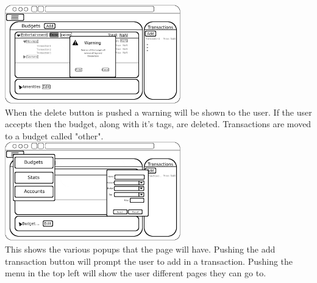 \documentclass[12pt]{article}
\begin{document}
\includegraphics[width=3in]{BudgetPageWarning.png}\\
When the delete button is pushed a warning will be shown to the user. If the user accepts then the budget, along with it's tags, are deleted. Transactions are moved to a budget called "other".\\

\includegraphics[width=3in]{BudgetPageWithMenu.png}\\
This shows the various popups that the page will have. Pushing the add transaction button will prompt the user to add in a transaction. Pushing the menu in the top left will show the user different pages they can go to.\\
\end{document}
